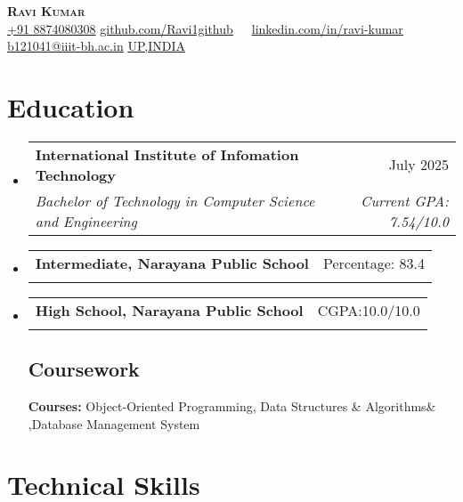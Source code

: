 \documentclass[letterpaper,11pt]{article}
\makeatletter
\newcommand{\resumeSubheading}[4]{
  \vspace{-2pt}\item
    \begin{tabular*}{0.97\textwidth}[t]{l@{\extracolsep{\fill}}r}
      \textbf{#1} & #2 \\
      \textit{\small#3} & \textit{\small #4} \\
    \end{tabular*}\vspace{-7pt}
}
\newcommand{\resumeSubHeadingListStart}{\begin{itemize}[leftmargin=0.15in, label={}]}
\newcommand{\resumeSubHeadingListEnd}{\end{itemize}}
\makeatother
\begin{document}
\begin{flushright}
  \color{gray}
  \item

\end{flushright}

\vspace{-5pt}

\begin{center}
    \textbf{\Huge \scshape Ravi Kumar} \\ \vspace{8pt}
    \small 
     {\underline{+91 8874080308}}
    \href{https://github.com/Ravi1github}{\underline{github.com/Ravi1github}} $  $
    \
    \href{https://www.linkedin.com/in/ravi-kumar-9a7786231/}{\underline{linkedin.com/in/ravi-kumar}} $  $
    \faIcon{envelope}
    \href{mailto:b121041@iiit-bh.ac.in}
    {\underline{b121041@iiit-bh.ac.in}}
     {\underline{UP,INDIA}}
\end{center}

\section{Education}
  \resumeSubHeadingListStart
  
    \resumeSubheading
      {International Institute of Infomation Technology}{July 2025}
      {Bachelor of Technology in Computer Science and Engineering}{Current GPA: 7.54/10.0}
      {}
    \resumeSubheading
      {Intermediate, Narayana Public School}{Percentage: 83.4}
      {}{}
        \resumeSubheading
      {High School, Narayana Public School}{CGPA:10.0/10.0}
      {}{}

    \vspace{-10pt}

    \subsection{Coursework}
      \textbf{Courses:} Object-Oriented Programming, Data Structures \& Algorithms\& ,Database Management System \
     

  \resumeSubHeadingListEnd


\section{Technical Skills}
\end{document}
